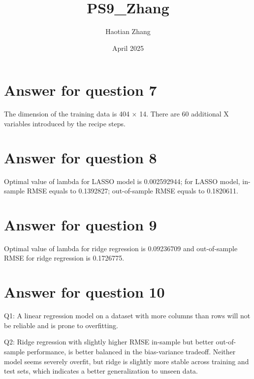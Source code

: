 \documentclass{article}
\title{PS9_Zhang}
\author{Haotian Zhang}
\date{April 2025}
\begin{document}
\maketitle

\section{Answer for question 7}
The dimension of the training data is 404 × 14. There are 60 additional X variables introduced by the recipe steps.

\section{Answer for question 8}

Optimal value of lambda for LASSO model is 0.002592944; for LASSO model, in-sample RMSE equals to 0.1392827; out-of-sample RMSE equals to 0.1820611.

\section{Answer for question 9}

Optimal value of lambda for ridge regression is 0.09236709 and out-of-sample RMSE for ridge regression is 0.1726775.

\section{Answer for question 10}

Q1: A linear regression model on a dataset with more columns than rows will not be reliable and is prone to overfitting.

Q2: Ridge regression with slightly higher RMSE in-sample but better out-of-sample performance, is better balanced in the bias-variance tradeoff.
Neither model seems severely overfit, but ridge is slightly more stable across training and test sets, which indicates a better generalization to unseen data.
\end{document}
